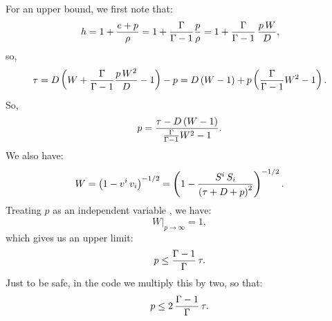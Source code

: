 \documentclass[10pt,preprint]{aastex}
\begin{document}
For an upper bound, we first note that:
\begin{equation}
h=1+\frac{e+p}{\rho}=1+\frac{\Gamma}{\Gamma-1}\frac{p}{\rho}=1+\frac{\Gamma}{\Gamma-1}\,\frac{p\,W}{D},
\end{equation}
so,
\begin{equation}
\tau=D\left(W+\frac{\Gamma}{\Gamma-1}\frac{p\,W^{2}}{D}-1\right)-p=D\left(W-1\right)+p\left(\frac{\Gamma}{\Gamma-1}W^{2}-1\right).
\end{equation}
So,
\begin{equation}
p=\frac{\tau-D\left(W-1\right)}{\frac{\Gamma}{\Gamma-1}W^{2}-1}.
\end{equation}
We also have:
\begin{equation}
W=\left(1-v^{i}\,v_{i}\right)^{-1/2}=\left(1-\frac{S^{i}\,S_{i}}{\left(\tau+D+p\right)^{2}}\right)^{-1/2}.
\end{equation}
Treating $p$ as an independent variable , we have:
\begin{equation}
W\Big|_{p\rightarrow\infty}=1,
\end{equation}
which gives us an upper limit:
\begin{equation}
p\leq\frac{\Gamma-1}{\Gamma}\,\tau.
\end{equation}
Just to be safe, in the code we multiply this by two, so that:
\begin{equation}
p\leq2\,\frac{\Gamma-1}{\Gamma}\,\tau.
\end{equation}

\newpage







\end{document}

